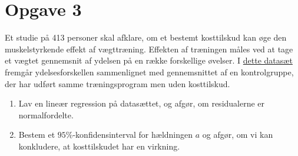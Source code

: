 \section*{Opgave 3}
Et studie på 413 personer skal afklare, om et bestemt kosttilskud kan øge den muskelstyrkende effekt af vægttræning. Effekten af træningen måles ved at tage et vægtet gennemsnit
af ydelsen på en række forskellige øvelser. I 
\href{https://github.com/ChristianJLex/TeachingNotes/raw/master/2022-2023/Data%20og%20lign/kosttilskud.xlsx}{\color{blue!60}dette datasæt}
 fremgår ydelsesforskellen sammenlignet med gennemsnittet af en kontrolgruppe, der har udført samme træningsprogram men uden kosttilskud. 

\begin{enumerate}[label=\roman*)]
	\item Lav en lineær regression på datasættet, og afgør, om residualerne er normalfordelte. 
	\item Bestem et $95\%$-konfidensinterval for hældningen $a$ og afgør, om vi kan konkludere, at kosttilskudet har en virkning. 
\end{enumerate}
